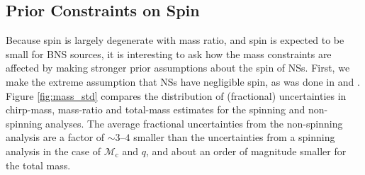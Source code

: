\subsection{Prior Constraints on Spin}
\label{subsec:prior_constraints}

Because spin is largely degenerate with mass ratio, and spin is expected to be small for BNS sources, it is interesting to ask how the mass constraints are affected by making stronger prior assumptions about the spin of NSs.  First, we make the extreme assumption that NSs have negligible spin, as was done in \citet{Singer_2014} and \citet{Berry_2014}.  Figure \ref{fig:mass_std} compares the distribution of (fractional) uncertainties in chirp-mass, mass-ratio and total-mass estimates for the spinning and non-spinning analyses. The average fractional uncertainties from the non-spinning analysis are a factor of $\sim3$--$4$ smaller than the uncertainties from a spinning analysis in the case of $\mathcal{M}_\mathrm{c}$ and $q$, and about an order of magnitude smaller for the total mass.
  
  
  
  
  
  
  
  
  
  
  
  
  
  
  
  
